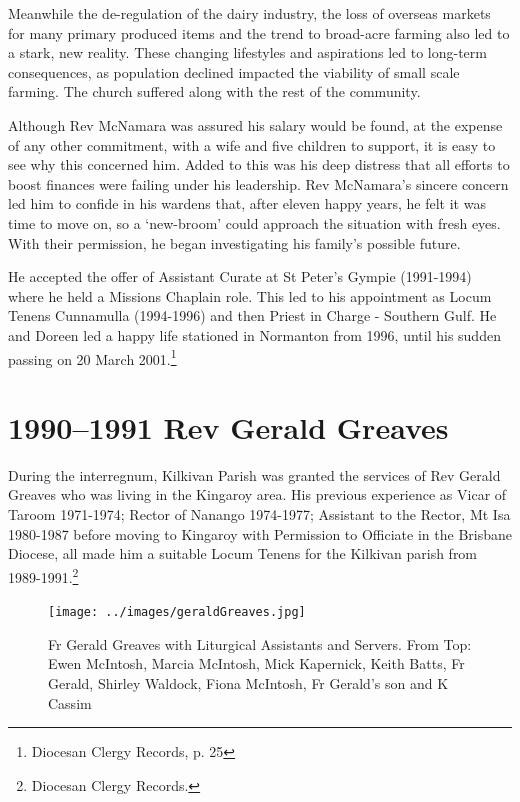 Meanwhile the de-regulation of the dairy industry, the loss of overseas markets for many primary produced items and the trend to broad-acre farming also led to a stark, new reality. These changing lifestyles and aspirations led to long-term consequences, as population declined impacted the viability of small scale farming. The church suffered along with the rest of the community.



Although Rev McNamara was assured his salary would be found, at the expense of any other commitment, with a wife and five children to support, it is easy to see why this concerned him. Added to this was his deep distress that all efforts to boost finances were failing under his leadership. Rev McNamara's sincere concern led him to confide in his wardens that, after eleven happy years, he felt it was time to move on, so a `new-broom' could approach the situation with fresh eyes. With their permission, he began investigating his family's possible future.



He accepted the offer of Assistant Curate at St Peter's Gympie (1991-1994) where he held a Missions Chaplain role. This led to his appointment as Locum Tenens Cunnamulla (1994-1996) and then Priest in Charge - Southern Gulf. He and Doreen led a happy life stationed in Normanton from 1996, until his sudden passing on 20 March 2001.\footnote{Diocesan Clergy Records, p. 25}


\section{1990--1991 Rev Gerald Greaves}



During the interregnum, Kilkivan Parish was granted the services of Rev Gerald Greaves who was living in the Kingaroy area. His previous experience as Vicar of Taroom 1971-1974; Rector of Nanango 1974-1977; Assistant to the Rector, Mt Isa 1980-1987 before moving to Kingaroy with Permission to Officiate in the Brisbane Diocese, all made him a suitable Locum Tenens for the Kilkivan parish from 1989-1991.\footnote{Diocesan Clergy Records.}








\begin{figure}
\begin{center}
\texttt{[image: ../images/geraldGreaves.jpg]}
\caption{Fr Gerald Greaves with Liturgical Assistants and Servers. From Top: Ewen McIntosh, Marcia McIntosh, Mick Kapernick, Keith Batts, Fr Gerald, Shirley Waldock, Fiona McIntosh, Fr Gerald's son and K Cassim}
\end{center}
\end{figure}




